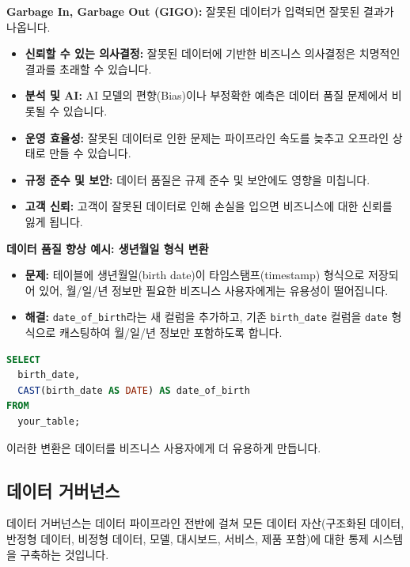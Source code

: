 \documentclass[11pt,a4paper]{article}
\theoremstyle{definition}
\begin{document}
\begin{enumerate}
\begin{warningbox}
\textbf{Garbage In, Garbage Out (GIGO):} 잘못된 데이터가 입력되면 잘못된 결과가 나옵니다.
\begin{itemize}
    \item \textbf{신뢰할 수 있는 의사결정:} 잘못된 데이터에 기반한 비즈니스 의사결정은 치명적인 결과를 초래할 수 있습니다.
    \item \textbf{분석 및 AI:} AI 모델의 편향(Bias)이나 부정확한 예측은 데이터 품질 문제에서 비롯될 수 있습니다.
    \item \textbf{운영 효율성:} 잘못된 데이터로 인한 문제는 파이프라인 속도를 늦추고 오프라인 상태로 만들 수 있습니다.
    \item \textbf{규정 준수 및 보안:} 데이터 품질은 규제 준수 및 보안에도 영향을 미칩니다.
    \item \textbf{고객 신뢰:} 고객이 잘못된 데이터로 인해 손실을 입으면 비즈니스에 대한 신뢰를 잃게 됩니다.
\end{itemize}
\end{warningbox}

\begin{examplebox}
\textbf{데이터 품질 향상 예시: 생년월일 형식 변환}
\begin{itemize}
    \item \textbf{문제:} 테이블에 생년월일(birth date)이 타임스탬프(timestamp) 형식으로 저장되어 있어, 월/일/년 정보만 필요한 비즈니스 사용자에게는 유용성이 떨어집니다.
    \item \textbf{해결:} \texttt{date_of_birth}라는 새 컬럼을 추가하고, 기존 \texttt{birth_date} 컬럼을 \texttt{date} 형식으로 캐스팅하여 월/일/년 정보만 포함하도록 합니다.
\end{itemize}
\begin{lstlisting}[language=sql, caption={생년월일 형식 변환 예시}, label={lst:birth_date_conversion}]
SELECT
  birth_date,
  CAST(birth_date AS DATE) AS date_of_birth
FROM
  your_table;
\end{lstlisting}
이러한 변환은 데이터를 비즈니스 사용자에게 더 유용하게 만듭니다.
\end{examplebox}

\subsection{데이터 거버넌스}

데이터 거버넌스는 데이터 파이프라인 전반에 걸쳐 모든 데이터 자산(구조화된 데이터, 반정형 데이터, 비정형 데이터, 모델, 대시보드, 서비스, 제품 포함)에 대한 통제 시스템을 구축하는 것입니다.


\end{enumerate}
\end{document}
